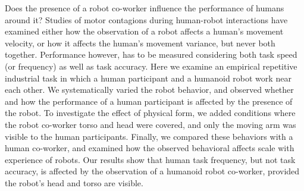 \documentclass[a4paper, 11pt, oneside]{Thesis}  %
\begin{document}
Does the presence of a robot co-worker influence the performance of humans around it? Studies of motor contagions during human-robot interactions have examined either how the observation of a robot affects a human's movement velocity, or how it affects the human's movement variance, but never both together. Performance however, has to be measured considering both task speed (or frequency) as well as task accuracy. Here we examine an empirical repetitive industrial task in which a human participant and a humanoid robot work near each other. We systematically varied the robot behavior, and observed whether and how the performance of a human participant is affected by the presence of the robot. To investigate the effect of physical form, we added conditions where the robot co-worker torso and head were covered, and only the moving arm was visible to the human participants. Finally, we compared these behaviors with a human co-worker, and examined how the observed behavioral affects scale with experience of robots. Our results show that human task frequency, but not task accuracy, is affected by the observation of a humanoid robot co-worker, provided the robot's head and torso are visible.%



\clearpage  %


\clearpage  %

\pagestyle{fancy}  %


\tableofcontents  %

\listoffigures  %
\end{document}
